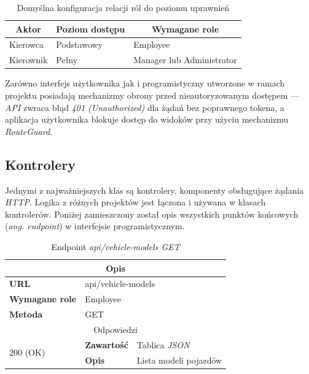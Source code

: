 \documentclass[eng,printmode,openany]{mgr}
\begin{document}
	
	\begin{table}[H]
		\caption{Domyślna konfiguracja relacji ról do poziomu uprawnień}
		\begin{tabularx}{\textwidth}{|l|l|X|}
			\hline
			\multicolumn{1}{|c|}{\textbf{Aktor}} & \multicolumn{1}{c|}{\textbf{Poziom dostępu}} & \multicolumn{1}{c|}{\textbf{Wymagane role}} \\ \hline
			Kierowca                             & Podstawowy                                   & Employee                                    \\ \hline
			Kierownik                            & Pełny                                        & Manager lub Administrator                   \\ \hline
		\end{tabularx}
	\end{table}
	
	Zarówno interfejs użytkownika jak i programistyczny utworzone w ramach projektu posiadają mechanizmy obrony przed nieautoryzowanym dostępem — \textit{API} zwraca błąd \textit{401 (Unauthorized)} dla żądań bez poprawnego tokena, a aplikacja użytkownika blokuje dostęp do widoków przy użyciu mechanizmu \textit{RouteGuard}.
	
	\subsection{Kontrolery}
	Jednymi z najważniejszych klas są kontrolery, komponenty obsługujące żądania \textit{HTTP}. Logika z różnych projektów jest łączona i używana w klasach kontrolerów.
	Poniżej zamieszczony został opis wszystkich punktów końcowych (\textit{ang. endpoint}) w interfejsie programistycznym.
	\begin{table}[H]
		\caption{Endpoint \textit{api/vehicle-models GET}}
		\begin{tabularx}{\textwidth}{|l|l|X|}
			\hline
			\multicolumn{3}{|c|}{\textbf{\textbf{Opis}}}
			\\ \hline
			\textbf{URL}                         & \multicolumn{2}{l|}{api/vehicle-models}
			\\ \hline
			\textbf{Wymagane role}               & \multicolumn{2}{l|}{Employee}
			\\ \hline
			\textbf{Metoda}                      & \multicolumn{2}{l|}{GET}
			\\ \hline
			\multicolumn{3}{|c|}{ Odpowiedzi}
			\\ \hline
			\multirow{2}{*}{200 (OK)}   & \textbf{Zawartość}         & Tablica \textit{JSON}
			\\ \cline{2-3}              & \textbf{Opis}         	    & Lista modeli pojazdów
			\\ \hline
		\end{tabularx}
	\end{table}
	
\end{document}
